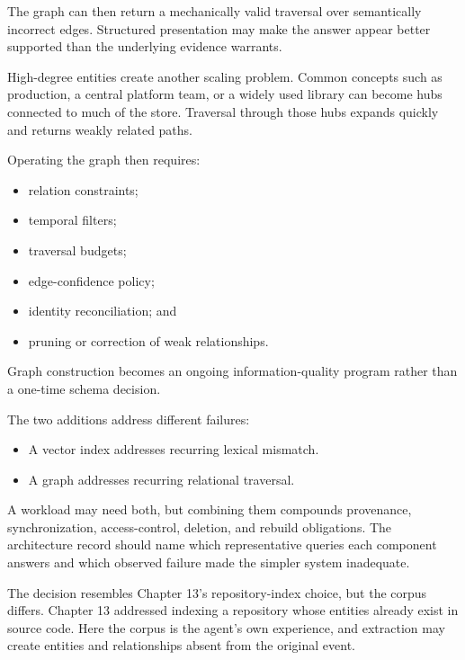 The graph can then return a mechanically valid traversal over semantically incorrect edges. Structured presentation may make the answer appear better supported than the underlying evidence warrants.

High-degree entities create another scaling problem. Common concepts such as production, a central platform team, or a widely used library can become hubs connected to much of the store. Traversal through those hubs expands quickly and returns weakly related paths.


Operating the graph then requires:

\begin{itemize}
\tightlist
\item
  relation constraints;
\item
  temporal filters;
\item
  traversal budgets;
\item
  edge-confidence policy;
\item
  identity reconciliation; and
\item
  pruning or correction of weak relationships.
\end{itemize}

Graph construction becomes an ongoing information-quality program rather than a one-time schema decision.


The two additions address different failures:

\begin{itemize}
\tightlist
\item
  A vector index addresses recurring lexical mismatch.
\item
  A graph addresses recurring relational traversal.
\end{itemize}

A workload may need both, but combining them compounds provenance, synchronization, access-control, deletion, and rebuild obligations. The architecture record should name which representative queries each component answers and which observed failure made the simpler system inadequate.

The decision resembles Chapter 13's repository-index choice, but the corpus differs. Chapter 13 addressed indexing a repository whose entities already exist in source code. Here the corpus is the agent's own experience, and extraction may create entities and relationships absent from the original event.

